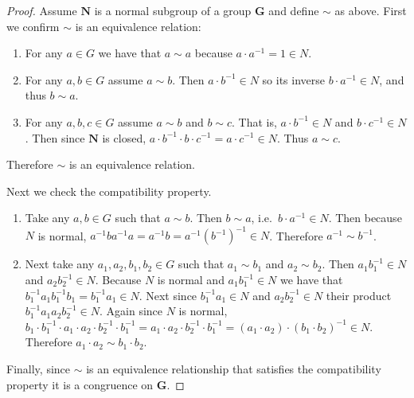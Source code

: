 \begin{proof}
  Assume $\mathbf{N}$ is a normal subgroup of a group $\mathbf{G}$ and define $\sim$ as above.
  First we confirm $\sim$ is an equivalence relation:
  \begin{enumerate}
    \item
      For any $a \in G$ we have that $a \sim a$ because $a\cdot a^{-1} = 1 \in N$.
    \item
      For any $a, b \in G$ assume $a \sim b$.
      Then $a\cdot b^{-1} \in N$ so its inverse $b\cdot a^{-1}\in N$, and thus $b \sim a$.
    \item
      For any $a, b, c \in G$ assume $a \sim b$ and $b \sim c$.
      That is, $a\cdot b^{-1} \in N$ and $b\cdot c^{-1} \in N$.
      Then since $\mathbf{N}$ is closed, $a\cdot b^{-1}\cdot b\cdot c^{-1} = a \cdot c^{-1} \in N$.
      Thus $a\sim c$.
  \end{enumerate}
  Therefore $\sim$ is an equivalence relation.

  Next we check the compatibility property.
  \begin{enumerate}
    \item
      Take any $a, b \in G$ such that $a \sim b$.
      Then $b \sim a$, i.e.\ $b\cdot a^{-1} \in N$.
      Then because $N$ is normal, $a^{-1}ba^{-1}a = a^{-1}b = a^{-1}(b^{-1})^{-1} \in N$.
      Therefore $a^{-1} \sim b^{-1}$.                 
    \item
      Next take any $a_1, a_2, b_1, b_2 \in G$ such that $a_1 \sim b_1$ and $a_2 \sim b_2$.
      Then $a_1b_1^{-1} \in N$ and $a_2b_2^{-1} \in N$.
      Because $N$ is normal and $a_1b_1^{-1} \in N$ we have that $b_1^{-1}a_1b_1^{-1}b_1 = b_1^{-1}a_1\in N$.
      Next since $b_1^{-1}a_1\in N$ and $a_2b_2^{-1} \in N$ their product $b_1^{-1}a_1a_2b_2^{-1} \in N$.
      Again since $N$ is normal, $b_1\cdot b_1^{-1}\cdot a_1\cdot a_2\cdot b_2^{-1}\cdot b_1^{-1} = a_1\cdot a_2\cdot b_2^{-1}\cdot b_1^{-1} = (a_1\cdot a_2)\cdot(b_1\cdot b_2)^{-1} \in N$.
      Therefore $a_1\cdot a_2 \sim b_1\cdot b_2$.
  \end{enumerate}
  Finally, since $\sim$ is an equivalence relationship that satisfies the compatibility property it is a congruence on $\mathbf{G}$.
\end{proof}
